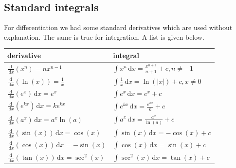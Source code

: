 \documentclass[
  english,
  11pt,
  oneside]{book}
\newcounter{none} %
\newcommand{\slide}{}
\theoremstyle{definition}
\theoremstyle{definition}
\theoremstyle{definition}
\theoremstyle{definition}
\theoremstyle{remark}
\begin{document}
\slide

\subsection{Standard integrals}\label{standard-integrals}

For differentiation we had some standard derivatives which are used without explanation. The same is true for integration. A list is given below.

\slide

{\def\LTcaptype{none} %
\begin{longtable}[]{@{}
  >{\raggedright\arraybackslash}p{}
  >{\raggedright\arraybackslash}p{}@{}}
\toprule\noalign{}
\begin{minipage}[b]{\linewidth}\raggedright
derivative
\end{minipage} & \begin{minipage}[b]{\linewidth}\raggedright
integral
\end{minipage} \\
\midrule\noalign{}
\endhead
\bottomrule\noalign{}
\endlastfoot
\(\frac{\mathrm{d}}{\,\mathrm{d}x}(x^n)=nx^{n-1}\) & \(\displaystyle\int x^n\,\mathrm{d}x = \frac{x^{n+1}}{n+1}+c, n\ne -1\) \\
\(\frac{\mathrm{d}}{\,\mathrm{d}x}(\ln(x)) = \frac 1x\) & \(\displaystyle\int\frac{1}{x}\,\mathrm{d}x = \ln( | x | )+c, x\neq0\) \\
\(\frac{\mathrm{d}}{\,\mathrm{d}x}(e^x)\,\mathrm{d}x = e^x\) & \(\displaystyle\int e^x \,\mathrm{d}x = e^x + c\) \\
\(\frac{\mathrm{d}}{\,\mathrm{d}x}(e^{kx})\,\mathrm{d}x = ke^{kx}\) & \(\displaystyle\int e^{kx} \,\mathrm{d}x = \frac{e^{kx}}{k} + c\) \\
\(\frac{\mathrm{d}}{\,\mathrm{d}x}(a^x)\,\mathrm{d}x = a^x\ln(a)\) & \(\displaystyle\int a^x \,\mathrm{d}x = \frac{a^x}{\ln(a)} + c\) \\
\(\frac{\mathrm{d}}{\,\mathrm{d}x}(\sin(x))\,\mathrm{d}x=\cos(x)\) & \(\displaystyle\int \sin(x)\,\mathrm{d}x=-\cos(x)+c\) \\
\(\frac{\mathrm{d}}{\,\mathrm{d}x}(\cos(x))\,\mathrm{d}x=-\sin(x)\) & \(\displaystyle\int \cos(x)\,\mathrm{d}x=\sin(x)+c\) \\
\(\frac{\mathrm{d}}{\,\mathrm{d}x}(\tan(x))\,\mathrm{d}x=\sec^2(x)\) & \(\displaystyle\int \sec^2(x)\,\mathrm{d}x=\tan(x)+c\) \\
\end{longtable}
}
\end{document}

